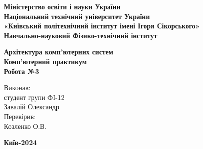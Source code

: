 \documentclass[a4paper,12pt]{article}
\begin{document}
    \pagestyle{fancy}
    \fancyhead{}
    \begin{center}
        \large{\textbf{Міністерство освіти і науки України\\
                Національний технічний університет України\\
                «Київський політехнічний інститут імені Ігоря Сікорського»\\
                Навчально-науковий Фізико-технічний інститут}}\\
        \hfill \break \hfill \break \hfill\break \hfill \break \hfill \break \hfill \break \hfill \break
        \hfill \break \hfill \break \hfill \break
        \begin{center}
            \normalsize{\textbf{Архітектура комп'ютерних систем\\
            Комп’ютерний практикум\\
            Робота №3}}
        \end{center}
    \end{center}
    \hfill \break \hfill \break \hfill \break \hfill \break \hfill \break \hfill \break \hfill \break
    \hfill \break \hfill \break \hfill \break \hfill \break 
    \begin{flushright}
        \large{ \hspace{35pt} Виконав:\\
            студент групи ФI-12\\
            Завалій Олександр\\} 
        \large{ \hspace{35pt} Перевірив:\\
        Козленко О.В.} 
    \end{flushright}
    \hfill \break \hfill \break \hfill \break \hfill \break \hfill \break \hfill \break \hfill \break
    \hfill \break
    \begin{center} \textbf{Київ-2024} \end{center}
    \thispagestyle{empty}
\end{document}
